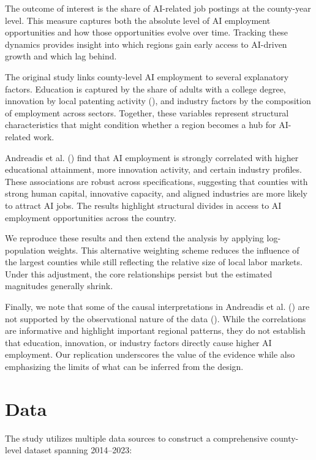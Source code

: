 \documentclass[
]{article}
\begin{document}
The outcome of interest is the share of AI-related job postings at the
county-year level. This measure captures both the absolute level of AI
employment opportunities and how those opportunities evolve over time.
Tracking these dynamics provides insight into which regions gain early
access to AI-driven growth and which lag behind.

The original study links county-level AI employment to several
explanatory factors. Education is captured by the share of adults with a
college degree, innovation by local patenting activity
(), and
industry factors by the composition of employment across sectors.
Together, these variables represent structural characteristics that
might condition whether a region becomes a hub for AI-related work.

Andreadis et al. () find that AI
employment is strongly correlated with higher educational attainment,
more innovation activity, and certain industry profiles. These
associations are robust across specifications, suggesting that counties
with strong human capital, innovative capacity, and aligned industries
are more likely to attract AI jobs. The results highlight structural
divides in access to AI employment opportunities across the country.

We reproduce these results and then extend the analysis by applying
log-population weights. This alternative weighting scheme reduces the
influence of the largest counties while still reflecting the relative
size of local labor markets. Under this adjustment, the core
relationships persist but the estimated magnitudes generally shrink.

Finally, we note that some of the causal interpretations in Andreadis et
al. () are not supported by the
observational nature of the data (). While the correlations are informative and highlight important
regional patterns, they do not establish that education, innovation, or
industry factors directly cause higher AI employment. Our replication
underscores the value of the evidence while also emphasizing the limits
of what can be inferred from the design.

\section{Data}\label{data}

The study utilizes multiple data sources to construct a comprehensive
county-level dataset spanning 2014--2023:
\end{document}
